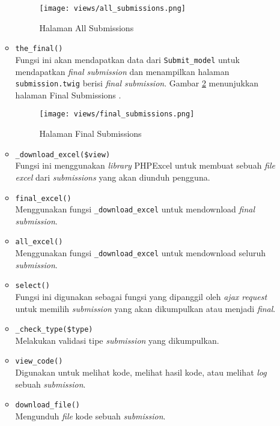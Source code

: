\begin{itemize}
\begin{itemize}
		            \begin{figure}
			            \centering
			            \texttt{[image: views/all\_submissions.png]}
			            \caption{Halaman All Submissions}
			            \label{fig:3:1:1:all}
		            \end{figure}
		      \item \verb|the_final()| \\
		            Fungsi ini akan mendapatkan data dari \verb|Submit_model| untuk mendapatkan \textit{final submission} dan menampilkan halaman \verb|submission.twig| berisi \textit{final submission}. Gambar \ref{fig:3:1:1:final} menunjukkan halaman Final Submissions .
		            \begin{figure}[h]
			            \centering
			            \texttt{[image: views/final\_submissions.png]}
			            \caption{Halaman Final Submissions}
			            \label{fig:3:1:1:final}
		            \end{figure}
		      \item \verb|_download_excel($view)| \\
		            Fungsi ini menggunakan \textit{library} PHPExcel untuk membuat sebuah \textit{file excel} dari \textit{submissions} yang akan diunduh pengguna.
		      \item \verb|final_excel()| \\
		            Menggunakan fungsi \verb|_download_excel| untuk mendownload \textit{final submission}.
		      \item \verb|all_excel()| \\
		            Menggunakan fungsi \verb|_download_excel| untuk mendownload seluruh \textit{submission}.
		      \item \verb|select()| \\
		            Fungsi ini digunakan sebagai fungsi yang dipanggil oleh \textit{ajax request} untuk memilih \textit{submission} yang akan dikumpulkan atau menjadi \textit{final}.
		      \item \verb|_check_type($type)| \\
		            Melakukan validasi tipe \textit{submission} yang dikumpulkan.
		      \item \verb|view_code()| \\
		            Digunakan untuk melihat kode, melihat hasil kode, atau melihat \textit{log} sebuah \textit{submission}.
		      \item \verb|download_file()| \\
		            Mengunduh \textit{file} kode sebuah \textit{submission}.
	      \end{itemize}


\end{itemize}
